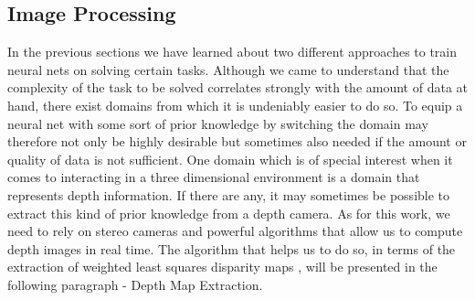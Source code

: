 \subsection{Image Processing}
In the previous sections we have learned about two different approaches to train neural nets on solving certain tasks. Although we came to understand that the complexity of the task to be solved correlates strongly with the amount of data at hand, there exist domains from which it is undeniably easier to do so. To equip a neural net with some sort of prior knowledge by switching the domain may therefore not only be highly desirable but sometimes also needed if the amount or quality of data is not sufficient. One domain which is of special interest when it comes to interacting in a three dimensional environment is a domain that represents depth information. If there are any, it may sometimes be possible to extract this kind of prior knowledge from a depth camera. As for this work, we need to rely on stereo cameras and powerful algorithms that allow us to compute depth images in real time. The algorithm that helps us to do so, in terms of the extraction of weighted least squares disparity maps \cite{min2014fast}, will be presented in the following paragraph - Depth Map Extraction.

